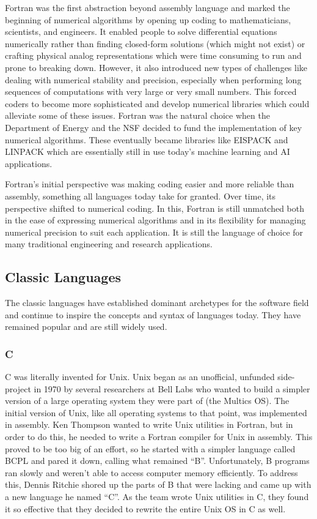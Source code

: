 Fortran was the first abstraction beyond assembly language and marked the
beginning of numerical algorithms by opening up coding to mathematicians,
scientists, and engineers. It enabled people to solve differential equations
numerically rather than finding closed-form solutions (which might not exist)
or crafting physical analog representations which were time consuming to run
and prone to breaking down. However, it also introduced new types of challenges
like dealing with numerical stability and precision, especially when performing
long sequences of computations with very large or very small numbers. This
forced coders to become more sophisticated and develop numerical libraries
which could alleviate some of these issues. Fortran was the natural choice when
the Department of Energy and the NSF decided to fund the implementation of key
numerical algorithms. These eventually became libraries like EISPACK and
LINPACK which are essentially still in use today's machine learning and AI
applications.

Fortran's initial perspective was making coding easier and more reliable than
assembly, something all languages today take for granted. Over time, its
perspective shifted to numerical coding. In this, Fortran is still unmatched
both in the ease of expressing numerical algorithms and in its flexibility for
managing numerical precision to suit each application. It is still the language
of choice for many traditional engineering and research applications.

\subsection{Classic Languages}

The classic languages have established dominant archetypes for the software
field and continue to inspire the concepts and syntax of languages today. They
have remained popular and are still widely used.

\subsubsection{C}

C was literally invented for Unix. Unix began as an unofficial, unfunded
side-project in 1970 by several researchers at Bell Labs who wanted to build a
simpler version of a large operating system they were part of (the Multics OS).
The initial version of Unix, like all operating systems to that point, was
implemented in assembly. Ken Thompson wanted to write Unix utilities in
Fortran, but in order to do this, he needed to write a Fortran compiler for
Unix in assembly. This proved to be too big of an effort, so he started with a
simpler language called BCPL and pared it down, calling what remained ``B''.
Unfortunately, B programs ran slowly and weren't able to access computer memory
efficiently. To address this, Dennis Ritchie shored up the parts of B that were
lacking and came up with a new language he named ``C''. As the team wrote Unix
utilities in C, they found it so effective that they decided to rewrite the
entire Unix OS in C as well.

